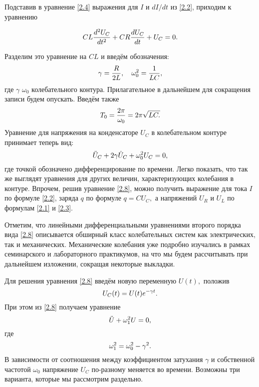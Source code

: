 Подставив в уравнение \eqref{2.4} выражения для $I$ и $dI/dt$ из \eqref{2.2}, приходим к уравнению

\begin{equation}
	\eqmark{2.5}
	CL\dfrac{d^2U_C}{dt^2}+CR\dfrac{dU_C}{dt}+U_C=0.
\end{equation}

Разделим это уравнение на $CL$ и введём обозначения:
\begin{equation}\eqmark{2.6}
\gamma=\dfrac{R}{2L},~~~\omega_0^2=\dfrac{1}{LC},
\end{equation}
где $\gamma$ \important{--}  $\omega_0$ \important{--}   колебательного контура. Прилагательное   в дальнейшем для сокращения записи будем опускать. Введём также  
\begin{equation}\eqmark{2.7}
T_0=\dfrac{2\pi}{\omega_0}=2\pi\sqrt{LC.}
\end{equation}
Уравнение для напряжения на конденсаторе $U_C$ в колебательном контуре принимает теперь вид:
\begin{equation}\eqmark{2.8}
\ddot{U}_C+2\gamma\dot{U}_C+\omega_0^2U_C=0,
\end{equation}
где точкой обозначено дифференцирование по времени. Легко показать, что так же выглядят уравнения для других величин, характеризующих колебания в контуре. Впрочем, решив уравнение \eqref{2.8}, можно получить выражение для тока $I$ по формуле \eqref{2.2}, заряда $q$ \important{--} по формуле $q=CU_C,$ а напряжений $U_R$ и $U_L$ \important{--} по формулам \eqref{2.1} и \eqref{2.3}.

Отметим, что линейными дифференциальными уравнениями второго порядка вида \eqref{2.8} описывается обширный класс колебательных систем как электрических, так и механических. Механические колебания уже подробно изучались в рамках семинарского и лабораторного практикумов, на что мы будем рассчитывать при дальнейшем изложении, сокращая некоторые выкладки.

Для решения уравнения \eqref{2.8} введём новую переменную $U(t),$ положив 
\begin{equation}\eqmark{2.9}
U_C(t)=U(t)e^{-\gamma t}.
\end{equation}
При этом из \eqref{2.8} получаем уравнение
\begin{equation}\eqmark{2.10}
\ddot{U}+\omega_1^2U=0,
\end{equation}
где
\begin{equation}\eqmark{2.11}
\omega_1^2=\omega_0^2-\gamma^2.
\end{equation}
В зависимости от соотношения между коэффициентом затухания $\gamma$ и собственной частотой $\omega_0$ напряжение $U_C$ по-разному меняется во времени. Возможны три варианта, которые мы рассмотрим раздельно.

